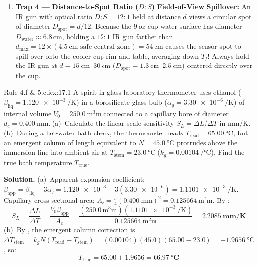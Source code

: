 \begin{trapbox}
\begin{enumerate}
  \item \textbf{Trap 4 --- Distance-to-Spot Ratio ($D:S$) Field-of-View Spillover:} 
  An IR gun with optical ratio $D:S = 12:1$ held at distance $d$ views a circular spot of diameter $D_{\mathrm{spot}} = d / 12$. Because the $\SI{9}{oz}$ cup water surface has diameter $D_{\mathrm{water}} \approx \SI{6.8}{\centi\meter}$, holding a $12:1$ IR gun farther than $d_{\max} = 12 \times (\SI{4.5}{\centi\meter}\text{ safe central zone}) = \SI{54}{\centi\meter}$ causes the sensor spot to spill over onto the cooler cup rim and table, averaging down $T_f$! Always hold the IR gun at $d = \SIrange{15}{30}{\centi\meter}$ ($D_{\mathrm{spot}} = \SIrange{1.3}{2.5}{\centi\meter}$) centered directly over the cup.
\end{enumerate}
\end{trapbox}

\begin{workedexample}{Rule 4.f \& 5.c.i}{ex:17.1}
A spirit-in-glass laboratory thermometer uses ethanol ($\beta_{\mathrm{liq}} = \SI{1.120e-3}{\per\kelvin}$) in a borosilicate glass bulb ($\alpha_g = \SI{3.30e-6}{\per\kelvin}$) of internal volume $V_0 = \SI{250.0}{\cubic\milli\meter}$ connected to a capillary bore of diameter $d_c = \SI{0.400}{\milli\meter}$. (a)~Calculate the linear scale sensitivity $S_L = \Delta L/\Delta T$ in $\si{\milli\meter\per\kelvin}$. (b)~During a hot-water bath check, the thermometer reads $T_{\mathrm{read}} = \SI{65.00}{\celsius}$, but an emergent column of length equivalent to $N = \SI{45.0}{\celsius}$ protrudes above the immersion line into ambient air at $T_{\mathrm{stem}} = \SI{23.0}{\celsius}$ ($k_g = \SI{0.00104}{\per\celsius}$). Find the true bath temperature $T_{\mathrm{true}}$.
\par\smallskip\noindent
\textbf{Solution.}
(a)~Apparent expansion coefficient: $\beta_{\mathrm{app}} = \beta_{\mathrm{liq}} - 3\alpha_g = \num{1.120e-3} - 3(\num{3.30e-6}) = \SI{1.1101e-3}{\per\kelvin}$. Capillary cross-sectional area: $A_c = \frac{\pi}{4}(\SI{0.400}{\milli\meter})^2 = \SI{0.125664}{\square\milli\meter}$. By :
$$S_L = \frac{\Delta L}{\Delta T} = \frac{V_0 \beta_{\mathrm{app}}}{A_c} = \frac{(\SI{250.0}{\cubic\milli\meter})(\SI{1.1101e-3}{\per\kelvin})}{\SI{0.125664}{\square\milli\meter}} = \mathbf{\SI{2.2085}{\milli\meter\per\kelvin}}$$
(b)~By , the emergent column correction is $\Delta T_{\mathrm{stem}} = k_g N (T_{\mathrm{read}} - T_{\mathrm{stem}}) = (\num{0.00104})(45.0)(65.00 - 23.0) = +\SI{1.9656}{\celsius}$, so:
$$T_{\mathrm{true}} = 65.00 + 1.9656 = \mathbf{\SI{66.97}{\celsius}}$$
\end{workedexample}

